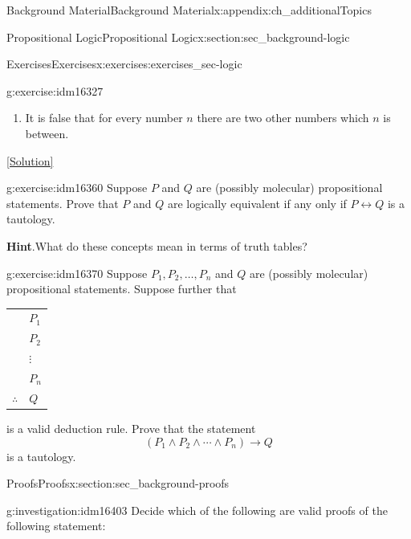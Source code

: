\documentclass[oneside,10pt,]{book}
\numberwithin{equation}{chapter}
\newcommand{\hrulethin}  {\noalign{\hrule height 0.04em}}
\def\iff{\leftrightarrow}
\def\imp{\rightarrow}
\begin{document}
\begin{appendixptx}{Background Material}{}{Background Material}{}{}{x:appendix:ch_additionalTopics}
\begin{sectionptx}{Propositional Logic}{}{Propositional Logic}{}{}{x:section:sec_background-logic}
\begin{exercises-subsection}{Exercises}{}{Exercises}{}{}{x:exercises:exercises_sec-logic}
\begin{divisionexercise}{14}{}{}{g:exercise:idm16327}
\begin{enumerate}[label=(\alph*)]
\item{}It is false that for every number \(n\) there are two other numbers which \(n\) is between.%
\end{enumerate}
%
\space\hspace*{0pt}\hfill{\tiny\hyperlink{g:solution:idm16346-main}{[Solution]}}\end{divisionexercise}%
\begin{divisionexercise}{15}{}{}{g:exercise:idm16360}%
Suppose \(P\) and \(Q\) are (possibly molecular) propositional statements.  Prove that \(P\) and \(Q\) are logically equivalent if any only if \(P \iff Q\) is a tautology.%
\par\smallskip%
\noindent\textbf{Hint}.\hypertarget{g:hint:idm16368}{}\quad{}What do these concepts mean in terms of truth tables?%
\end{divisionexercise}%
\begin{divisionexercise}{16}{}{}{g:exercise:idm16370}%
Suppose \(P_1, P_2, \ldots, P_n\) and \(Q\) are (possibly molecular) propositional statements.  Suppose further that%
\begin{sidebyside}{1}{0}{0}{0}%
\begin{sbspanel}{1}%
{\centering%
\begin{tabular}{ll}
&\(P_1\)\tabularnewline[0pt]
&\(P_2\)\tabularnewline[0pt]
&\(\vdots\)\tabularnewline[0pt]
&\(P_n\)\tabularnewline\hrulethin
\(\therefore\)&\(Q\)
\end{tabular}
\par}
\end{sbspanel}%
\end{sidebyside}%
\par
is a valid deduction rule.  Prove that the statement%
\begin{equation*}
(P_1 \wedge P_2 \wedge \cdots \wedge P_n) \imp Q
\end{equation*}
is a tautology.%
\end{divisionexercise}%
\end{exercises-subsection}
\end{sectionptx}
%
%
\typeout{************************************************}
\typeout{************************************************}
%
\begin{sectionptx}{Proofs}{}{Proofs}{}{}{x:section:sec_background-proofs}
\begin{introduction}{}%
\begin{investigation}{}{g:investigation:idm16403}%
Decide which of the following are valid proofs of the following statement:%

\end{investigation}
\end{introduction}
\end{sectionptx}
\end{appendixptx}
\end{document}

